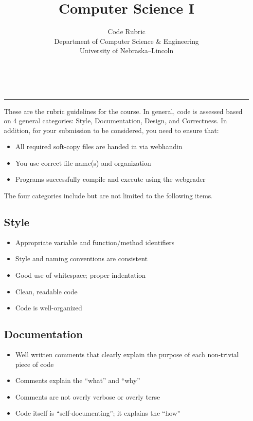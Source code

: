 \documentclass[12pt]{scrartcl}
\title{Computer Science I}\let\Title\@title
\subtitle{Code Rubric\\
{\small
\vskip1cm
Department of Computer Science \& Engineering \\
University of Nebraska--Lincoln}
\vskip-1cm}
\date{~}
\begin{document}
\maketitle


\hrule

These are the rubric guidelines for the course.  In general, code
is assessed based on 4 general categories: Style, Documentation, 
Design, and Correctness.  In addition, for your submission to be
considered, you need to ensure that:

\begin{itemize}
  \item All required soft-copy files are handed in via webhandin
  \item You use correct file name(s) and organization
  \item Programs successfully compile and execute using the webgrader
\end{itemize}

The four categories include but are not limited to
the following items.

\subsection*{Style}
\begin{itemize}
  \item Appropriate variable and function/method identifiers
  \item Style and naming conventions are consistent
  \item Good use of whitespace; proper indentation
  \item Clean, readable code
  \item Code is well-organized
\end{itemize}

\subsection*{Documentation}
\begin{itemize}
  \item Well written comments that clearly explain the purpose of each non-trivial piece of code
  \item Comments explain the ``what'' and ``why''
  \item Comments are not overly verbose or overly terse
  \item Code itself is ``self-documenting''; it explains the ``how''
\end{itemize}
\end{document}

